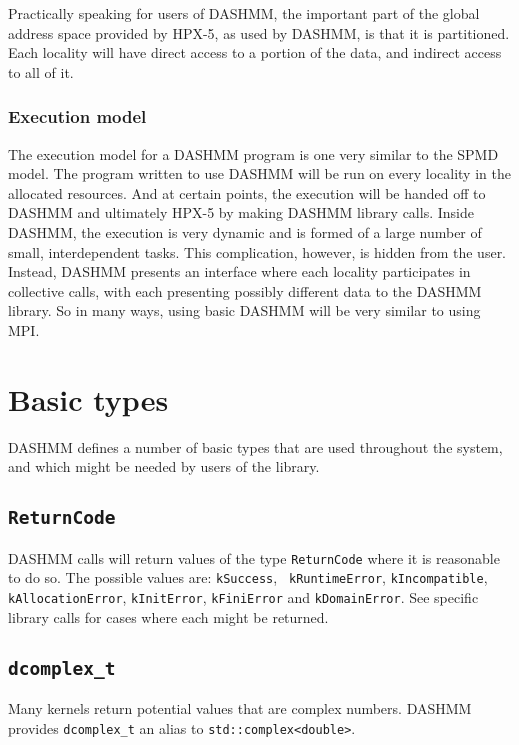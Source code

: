 Practically speaking for users of DASHMM, the important part of the global
address space provided by HPX-5, as used by DASHMM, is that it is partitioned.
Each locality will have direct access to a portion of the data, and
indirect access to all of it.

\subsubsection{Execution model}

The execution model for a DASHMM program is one very similar to the SPMD model.
The program written to use DASHMM will be run on every locality in the allocated
resources. And at certain points, the execution will be handed off to DASHMM and
ultimately HPX-5 by making DASHMM library calls. Inside DASHMM, the execution is
very dynamic and is formed of a large number of small, interdependent tasks.
This complication, however, is hidden from the user. Instead, DASHMM presents
an interface where each locality participates in collective calls, with each
presenting possibly different data to the DASHMM library. So in many ways,
using basic DASHMM will be very similar to using MPI.

\section{Basic types}

DASHMM defines a number of basic types that are used throughout the system,
and which might be needed by users of the library.

\subsection{{\tt ReturnCode}}

DASHMM calls will return values of the type {\tt ReturnCode} where it is
reasonable to do so. The possible values are: {\tt kSuccess}, {\tt
  kRuntimeError}, {\tt kIncompatible},
{\tt kAllocationError}, {\tt kInitError}, {\tt kFiniError} and
{\tt kDomainError}. See specific
library calls for cases where each might be returned.

\subsection{{\tt dcomplex\_t}}
Many kernels return potential values that are complex numbers. DASHMM provides
{\tt dcomplex\_t} an alias to {\tt std::complex<double>}.


